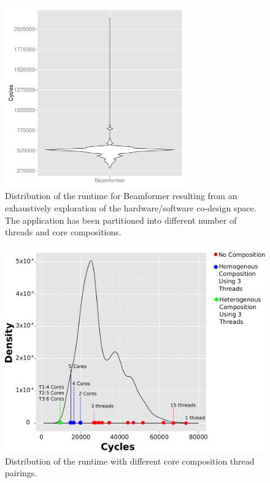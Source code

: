 \begin{figure}[h]
    \centering
    \includegraphics[width=0.7\textwidth]{streamit-paper/graphics/beamformer_motivation.pdf}
    \caption{Distribution of the runtime for Beamformer resulting from an exhaustively exploration of the hardware/software co-design space.
     The application has been partitioned into different number of threads and core compositions.}
     \label{fig:beamformermotiv}
\end{figure}

\begin{figure}[h]
    \centering
    \includegraphics[width=1\textwidth]{streamit-paper/graphics/temp_motivation_2.pdf}
    \caption{Distribution of the runtime with different core composition thread pairings.}
     \label{fig:threadcoremotiv}
\end{figure}


